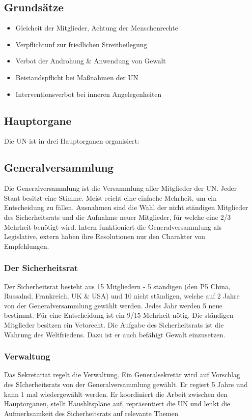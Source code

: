 \documentclass{article}
\begin{document}
\subsection*{Grundsätze}
\begin{itemize}
    \item Gleicheit der Mitglieder, Achtung der Menschenrechte
    \item Verpflichtunf zur friedlichen Streitbeilegung
    \item Verbot der Androhung \& Anwendung von Gewalt
    \item Beistandspflicht bei Maßnahmen der UN
    \item Interventionsverbot bei inneren Angelegenheiten
\end{itemize}
\subsection*{Hauptorgane}
Die UN ist in drei Hauptorganen organisiert:
\subsection*{Generalversammlung}
Die Generalversammlung ist die Versammlung aller Mitglieder der UN. Jeder Staat besitzt eine Stimme.
Meist reicht eine einfache Mehrheit, um ein Entscheidung zu fällen. Ausnahmen sind die Wahl der
nicht ständigen Mitglieder des Sicherheitsrats und die Aufnahme neuer Mitglieder, für welche eine 
2/3 Mehrheit benötigt wird. Intern funktioniert die Generalversammlung als Legislative, extern haben
ihre Resolutionen nur den Charakter von Empfehlungen.
\subsubsection*{Der Sicherheitsrat}
Der Sicherheitsrat besteht aus 15 Mitgliedern - 5 ständigen (den P5 China, Russalnd, Frankreich, UK \& USA)
und 10 nicht ständigen, welche auf 2 Jahre von der Generalversammlung gewählt werden. Jedes Jahr werden 5
neue bestimmt. Für eine Entscheidung ist ein 9/15 Mehrheit nötig. Die ständigen Mitglieder besitzen ein Vetorecht.
Die Aufgabe des Sicherheitsrats ist die Wahrung des Weltfriedens. Dazu ist er auch befähigt Gewalt einzusetzen.
\subsubsection*{Verwaltung}
Das Sekretariat regelt die Verwaltung. Ein Generalsekretär wird auf Vorschlag des SIcherheitsrats von der Generalversammlung
gewählt. Er regiert 5 Jahre und kann 1 mal wiedergewählt werden. Er koordiniert die Arbeit zwischen den Hauptorganen,
stellt Haushltspläne auf, repräsentiert die UN und lenkt die Aufmerksamkeit des Sicherheitsrats auf relevante Themen
\end{document}
